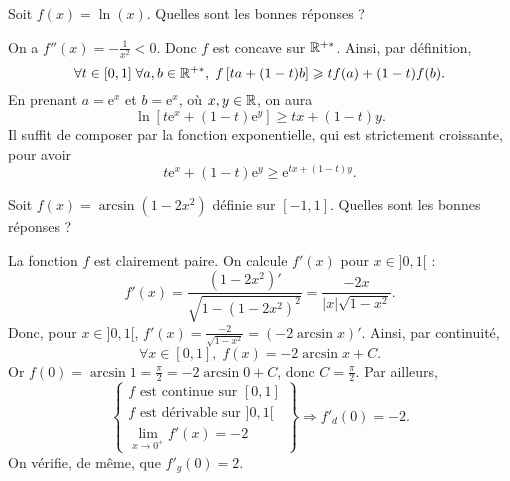 \begin{question}

Soit $f(x)=\ln (x)$. Quelles sont les bonnes réponses ?
\begin{answers}  
\end{answers}
\begin{explanations}
On a $\displaystyle f''(x)=-\frac{1}{x^2}<0$. Donc $f$ est concave sur $\mathbb{R}^{+*}$. Ainsi, par définition,
$$\forall t\in [0,1]\; \forall a,b\in \mathbb{R}^{+*},\; f\left[ta+(1-t)b\right]\geqslant tf(a)+(1-t)f(b).$$
En prenant $a=\mathrm{e}^x$ et $b=\mathrm{e}^x$, où $x,y\in \mathbb{R}$, on aura
$$\ln\left[t\mathrm{e}^x+(1-t)\mathrm{e}^y\right]\geq tx+(1-t)y.$$
Il suffit de composer par la fonction exponentielle, qui est strictement croissante, pour avoir
$$t\mathrm{e}^x+(1-t)\mathrm{e}^y\geq \mathrm{e}^{tx+(1-t)y}.$$
\end{explanations}
\end{question}



\begin{question}

Soit $f(x)=\arcsin (1-2x^2)$ définie sur $[-1,1]$. Quelles sont les bonnes réponses ?
\begin{answers}  
\end{answers}
\begin{explanations}
La fonction $f$ est clairement paire. On calcule $f'(x)$ pour $x\in ]0,1[$ : 
$$f'(x)=\frac{(1-2x^2)'}{\sqrt{1-(1-2x^2)^2}}=\frac{-2x}{|x|\sqrt{1-x^2}}.$$
Donc, pour $x\in ]0,1[$, $\displaystyle f'(x)=\frac{-2}{\sqrt{1-x^2}}=(-2\arcsin x)'$. Ainsi, par continuité,
$$\forall x\in [0,1],\; f(x)=-2\arcsin x+C.$$
Or $\displaystyle f(0)=\arcsin 1=\frac{\pi}{2}=-2\arcsin 0+C$, donc $\displaystyle C=\frac{\pi}{2}$. Par ailleurs,
$$\left\{\begin{array}{l}f\mbox{ est continue sur }[0,1]\\ f\mbox{ est dérivable sur }]0,1[\\ \displaystyle \lim _{x\to 0^+}f'(x)=-2
\end{array}\right\}\Rightarrow f'_d(0)=-2.$$
On vérifie, de même, que $f'_g(0)=2$.
\end{explanations}
\end{question}

